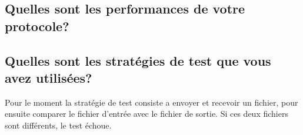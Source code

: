 \documentclass[10pt,a4paper]{article}
\begin{document}
\subsection{Quelles sont les performances de votre protocole?}

\subsection{Quelles sont les stratégies de test que vous avez utilisées?}
Pour le moment la stratégie de test consiste a envoyer et recevoir un fichier, pour ensuite comparer le fichier d'entrée avec le fichier de sortie. Si ces deux fichiers sont différents, le test échoue.
\end{document}
